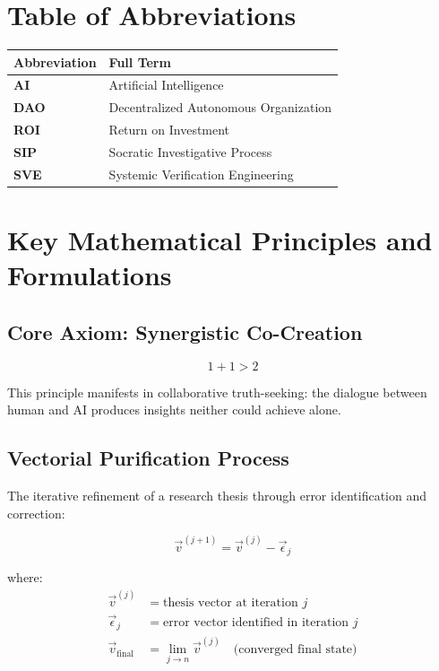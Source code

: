 \documentclass[11pt,a4paper]{article}
\begin{document}
\section*{Table of Abbreviations}

\begin{tabular}{@{}>{\bfseries}ll@{}}
\toprule
\normalfont\textbf{Abbreviation} & \textbf{Full Term} \\
\midrule
AI & Artificial Intelligence \\
DAO & Decentralized Autonomous Organization \\
ROI & Return on Investment \\
SIP & Socratic Investigative Process \\
SVE & Systemic Verification Engineering \\
\bottomrule
\end{tabular}

\vspace{1cm}

\section*{Key Mathematical Principles and Formulations}

\subsection*{Core Axiom: Synergistic Co-Creation}
\begin{equation}
1 + 1 > 2
\label{eq:synergy}
\end{equation}

\noindent This principle manifests in collaborative truth-seeking: the dialogue between human and AI produces insights neither could achieve alone.

\subsection*{Vectorial Purification Process}
The iterative refinement of a research thesis through error identification and correction:

\begin{equation}
\vec{v}^{(j+1)} = \vec{v}^{(j)} - \vec{\epsilon}_j
\label{eq:purification}
\end{equation}

where:
\begin{align*}
\vec{v}^{(j)} &= \text{thesis vector at iteration } j \\
\vec{\epsilon}_j &= \text{error vector identified in iteration } j \\
\vec{v}_{\text{final}} &= \lim_{j \to n} \vec{v}^{(j)} \quad \text{(converged final state)}
\end{align*}
\end{document}
